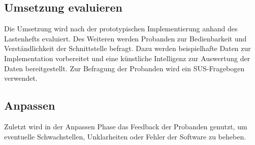 \subsection{Umsetzung evaluieren}
Die Umsetzung wird nach der prototypischen Implementierung anhand des Lastenhefts evaluiert. Des Weiteren werden Probanden zur Bedienbarkeit und Verständlichkeit der Schnittstelle befragt. Dazu werden beispielhafte Daten zur Implementation vorbereitet und eine künstliche Intelligenz zur Auswertung der Daten bereitgestellt. Zur Befragung der Probanden wird ein SUS-Fragebogen verwendet. 

\subsection{Anpassen}
Zuletzt wird in der \glqq Anpassen\grqq{} Phase das Feedback der Probanden genutzt, um eventuelle Schwachstellen, Unklarheiten oder Fehler der Software zu beheben. 